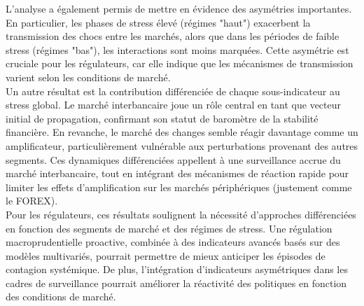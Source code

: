 L’analyse a également permis de mettre en évidence des asymétries importantes. En particulier, les phases de stress élevé (régimes "haut") exacerbent la transmission des chocs entre les marchés, alors que dans les périodes de faible stress (régimes "bas"), les interactions sont moins marquées. Cette asymétrie est cruciale pour les régulateurs, car elle indique que les mécanismes de transmission varient selon les conditions de marché.\\

Un autre résultat est la contribution différenciée de chaque sous-indicateur au stress global. Le marché interbancaire joue un rôle central en tant que vecteur initial de propagation, confirmant son statut de baromètre de la stabilité financière. En revanche, le marché des changes semble réagir davantage comme un amplificateur, particulièrement vulnérable aux perturbations provenant des autres segments. Ces dynamiques différenciées appellent à une surveillance accrue du marché interbancaire, tout en intégrant des mécanismes de réaction rapide pour limiter les effets d’amplification sur les marchés périphériques (justement comme le FOREX).\\

Pour les régulateurs, ces résultats soulignent la nécessité d’approches différenciées en fonction des segments de marché et des régimes de stress. Une régulation macroprudentielle proactive, combinée à des indicateurs avancés basés sur des modèles multivariés, pourrait permettre de mieux anticiper les épisodes de contagion systémique. De plus, l’intégration d’indicateurs asymétriques dans les cadres de surveillance pourrait améliorer la réactivité des politiques en fonction des conditions de marché.\\
